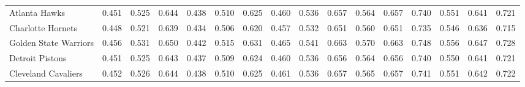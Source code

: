 \documentclass[11pt,a4paper]{article}
\begin{document}
\begin{table}[H]
\begin{tabular}{l ccc ccc ccc ccc ccc}
Atlanta Hawks & 0.451 & 0.525 & 0.644 & 0.438 & 0.510 & 0.625 & 0.460 & 0.536 & 0.657 & 0.564 & 0.657 & 0.740 & 0.551 & 0.641 & 0.721 \\
Charlotte Hornets & 0.448 & 0.521 & 0.639 & 0.434 & 0.506 & 0.620 & 0.457 & 0.532 & 0.651 & 0.560 & 0.651 & 0.735 & 0.546 & 0.636 & 0.715 \\
Golden State Warriors & 0.456 & 0.531 & 0.650 & 0.442 & 0.515 & 0.631 & 0.465 & 0.541 & 0.663 & 0.570 & 0.663 & 0.748 & 0.556 & 0.647 & 0.728 \\
Detroit Pistons & 0.451 & 0.525 & 0.643 & 0.437 & 0.509 & 0.624 & 0.460 & 0.536 & 0.656 & 0.564 & 0.656 & 0.740 & 0.550 & 0.641 & 0.721 \\
Cleveland Cavaliers & 0.452 & 0.526 & 0.644 & 0.438 & 0.510 & 0.625 & 0.461 & 0.536 & 0.657 & 0.565 & 0.657 & 0.741 & 0.551 & 0.642 & 0.722 \\
\bottomrule
\end{tabular}
\end{table}
\end{document}
